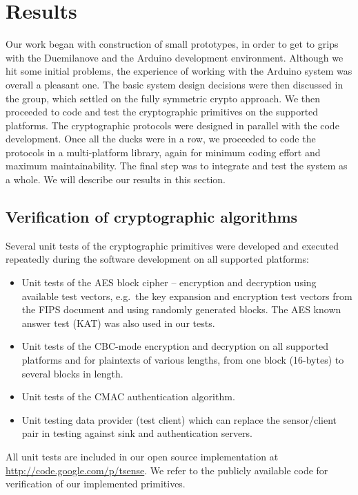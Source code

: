 
\chapter{Results}
\label{sec:results}

Our work began with construction of small prototypes, in order to get to grips with the Duemilanove and the Arduino development environment. Although we hit some initial problems, the experience of working with the Arduino system was overall a pleasant one. The basic system design decisions were then discussed in the group, which settled on the fully symmetric crypto approach. We then proceeded to code and test the cryptographic primitives on the supported platforms. The cryptographic protocols were designed in parallel with the code development. Once all the ducks were in a row, we proceeded to code the protocols in a multi-platform library, again for minimum coding effort and maximum maintainability. The final step was to integrate and test the system as a whole. We will describe our results in this section.

\section{Verification of cryptographic algorithms}

Several unit tests of the cryptographic primitives were developed and executed repeatedly during the software development on all supported platforms:
\begin{itemize}
\item Unit tests of the AES block cipher -- encryption and decryption using available test vectors, e.g.\ the key expansion and encryption test vectors from the FIPS \cite{} document and using randomly generated blocks. The AES known answer test (KAT) \cite{} was also used in our tests.
\item Unit tests of the CBC-mode encryption and decryption on all supported platforms and for plaintexts of various lengths, from one block (16-bytes) to several blocks in length.
\item Unit tests of the CMAC authentication algorithm. 
\item Unit testing data provider (test client) which can replace the sensor/client pair in testing against sink and authentication servers.
\end{itemize}
All unit tests are included in our open source implementation at \url{http://code.google.com/p/tsense}. We refer to the publicly available code for verification of our implemented primitives.

